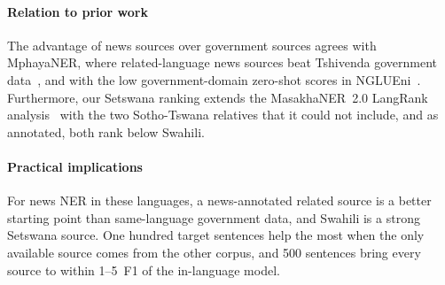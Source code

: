 \paragraph{Relation to prior work} The advantage of news sources over government sources agrees with MphayaNER, where related-language news sources beat Tshivenda government data~\cite{mbuvha2023}, and with the low government-domain zero-shot scores in NGLUEni~\cite{meyer2024}. Furthermore, our Setswana ranking extends the MasakhaNER~2.0 LangRank analysis~\cite{lin2019,adelani2022} with the two Sotho-Tswana relatives that it could not include, and as annotated, both rank below Swahili.

\paragraph{Practical implications} For news NER in these languages, a news-annotated related source is a better starting point than same-language government data, and Swahili is a strong Setswana source. One hundred target sentences help the most when the only available source comes from the other corpus, and 500 sentences bring every source to within 1--5~F1 of the in-language model.
